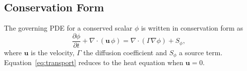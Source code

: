 \subsection{Conservation Form}

The governing \ac{PDE} for a conserved scalar $\phi$ is written in conservation form as
\begin{equation}
    \frac{\partial \phi}{\partial t} + \nabla \cdot \left( \bm{u}\,\phi \right) = \nabla \cdot \left( \Gamma \nabla \phi \right) + S_\phi,
    \label{eq:transport}
\end{equation}
where $\bm{u}$ is the velocity, $\Gamma$ the diffusion coefficient and $S_\phi$ a source term. Equation~\eqref{eq:transport} reduces to the heat equation when $\bm{u} = 0$. \lipsum[9]
